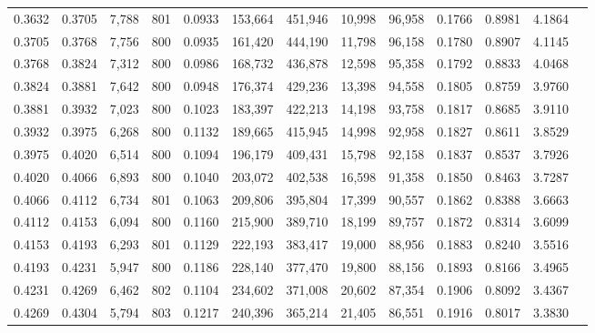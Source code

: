 \begin{tabular}{rrrrrrrrrrrrr}
0.3632 & 0.3705 &  7,788 & 801 &                                     0.0933 & 153,664 & 451,946 &  10,998 &  96,958 & 0.1766 & 0.8981 & 4.1864 \\
0.3705 & 0.3768 &  7,756 & 800 &                                     0.0935 & 161,420 & 444,190 &  11,798 &  96,158 & 0.1780 & 0.8907 & 4.1145 \\
0.3768 & 0.3824 &  7,312 & 800 &                                     0.0986 & 168,732 & 436,878 &  12,598 &  95,358 & 0.1792 & 0.8833 & 4.0468 \\
0.3824 & 0.3881 &  7,642 & 800 &                                     0.0948 & 176,374 & 429,236 &  13,398 &  94,558 & 0.1805 & 0.8759 & 3.9760 \\
0.3881 & 0.3932 &  7,023 & 800 &                                     0.1023 & 183,397 & 422,213 &  14,198 &  93,758 & 0.1817 & 0.8685 & 3.9110 \\
0.3932 & 0.3975 &  6,268 & 800 &                                     0.1132 & 189,665 & 415,945 &  14,998 &  92,958 & 0.1827 & 0.8611 & 3.8529 \\
0.3975 & 0.4020 &  6,514 & 800 &                                     0.1094 & 196,179 & 409,431 &  15,798 &  92,158 & 0.1837 & 0.8537 & 3.7926 \\
0.4020 & 0.4066 &  6,893 & 800 &                                     0.1040 & 203,072 & 402,538 &  16,598 &  91,358 & 0.1850 & 0.8463 & 3.7287 \\
0.4066 & 0.4112 &  6,734 & 801 &                                     0.1063 & 209,806 & 395,804 &  17,399 &  90,557 & 0.1862 & 0.8388 & 3.6663 \\
0.4112 & 0.4153 &  6,094 & 800 &                                     0.1160 & 215,900 & 389,710 &  18,199 &  89,757 & 0.1872 & 0.8314 & 3.6099 \\
0.4153 & 0.4193 &  6,293 & 801 &                                     0.1129 & 222,193 & 383,417 &  19,000 &  88,956 & 0.1883 & 0.8240 & 3.5516 \\
0.4193 & 0.4231 &  5,947 & 800 &                                     0.1186 & 228,140 & 377,470 &  19,800 &  88,156 & 0.1893 & 0.8166 & 3.4965 \\
0.4231 & 0.4269 &  6,462 & 802 &                                     0.1104 & 234,602 & 371,008 &  20,602 &  87,354 & 0.1906 & 0.8092 & 3.4367 \\
0.4269 & 0.4304 &  5,794 & 803 &                                     0.1217 & 240,396 & 365,214 &  21,405 &  86,551 & 0.1916 & 0.8017 & 3.3830 \\

\end{tabular}
